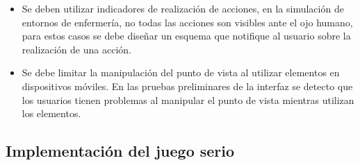 \begin{itemize}
\item Se deben utilizar indicadores de realización de acciones, en la simulación
    de entornos de enfermería, no todas las acciones son visibles ante el ojo
    humano, para estos casos se debe diseñar un esquema que notifique al usuario
    sobre la realización de una acción.
    
\item Se debe limitar la manipulación del punto de vista al utilizar elementos
    en dispositivos móviles. En las pruebas preliminares de la interfaz se
    detecto que los usuarios tienen problemas al manipular el punto de vista
    mientras utilizan los elementos.

\end{itemize}

\subsection{Implementación del juego serio}

